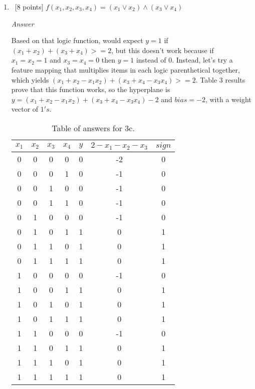 \documentclass[12pt, fullpage,letterpaper]{article}
\begin{document}
\begin{enumerate}
\begin{enumerate}
		\item~[8 points] $f(x_1, x_2, x_3, x_4) = (x_1 \lor x_2) \land (x_3 \lor x_4)$
		
		\emph{Answer}
		
		Based on that logic function, would expect $y=1$ if $(x_1+x_2)+(x_3+x_4)>=2$, but this doesn't work because if $x_1=x_2=1$ and $x_3=x_4=0$ then $y=1$ instead of $0$. Instead, let's try a feature mapping that multiplies items in each logic parenthetical together, which yields $(x_1+x_2-x_1x_2)+(x_3+x_4-x_3x_4)>=2$. Table 3 results prove that this function works, so the hyperplane is $y=(x_1+x_2-x_1x_2)+(x_3+x_4-x_3x_4)-2$ and $bias=-2$, with a weight vector of $1's$.
		
		\begin{table}
        	\centering
        	\begin{tabular}{cccccc|c}
        		$x_1 $ & $x_2$ & $x_3$ & $x_4$ & $y$ & $2-x_1-x_2-x_3$ & $sign$\\ 
        		\hline\hline
        		0 & 0 & 0 & 0 & 0 & -2 & 0 \\ \hline
        		0 & 0 & 0 & 1 & 0 & -1 & 0 \\ \hline
        		0 & 0 & 1 & 0 & 0 & -1 & 0 \\ \hline
        		0 & 0 & 1 & 1 & 0 & -1 & 0 \\ \hline
        		0 & 1 & 0 & 0 & 0 & -1 & 0 \\ \hline
        		0 & 1 & 0 & 1 & 1 &  0 & 1 \\ \hline
        		0 & 1 & 1 & 0 & 1 &  0 & 1 \\ \hline
        		0 & 1 & 1 & 1 & 1 &  0 & 1 \\ \hline
        		1 & 0 & 0 & 0 & 0 & -1 & 0 \\ \hline
        		1 & 0 & 0 & 1 & 1 &  0 & 1 \\ \hline
        		1 & 0 & 1 & 0 & 1 &  0 & 1 \\ \hline
        		1 & 0 & 1 & 1 & 1 &  0 & 1 \\ \hline
        		1 & 1 & 0 & 0 & 0 & -1 & 0 \\ \hline
        		1 & 1 & 0 & 1 & 1 &  0 & 1 \\ \hline
        		1 & 1 & 1 & 0 & 1 &  0 & 1 \\ \hline
        		1 & 1 & 1 & 1 & 1 &  0 & 1 \\ \hline
        	\end{tabular}
        	\caption{Table of answers for 3c.}\label{tb:1}
        \end{table}
        

\end{enumerate}
\end{enumerate}
\end{document}
